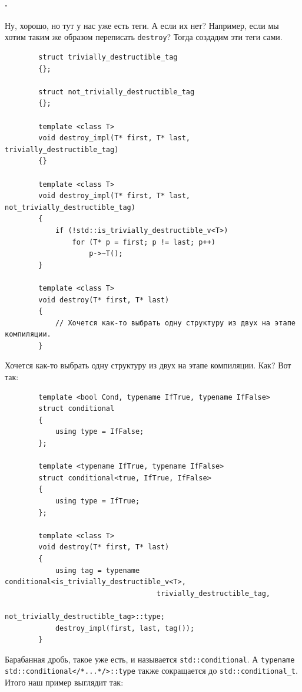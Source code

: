 \documentclass{article}
\begin{document}
    \paragraph{.}
    Ну, хорошо, но тут у нас уже есть теги. А если их нет? Например, если мы хотим таким же образом переписать \texttt{destroy}? Тогда создадим эти теги сами.
    \begin{verbatim}
        struct trivially_destructible_tag
        {};

        struct not_trivially_destructible_tag
        {};

        template <class T>
        void destroy_impl(T* first, T* last, trivially_destructible_tag)
        {}

        template <class T>
        void destroy_impl(T* first, T* last, not_trivially_destructible_tag)
        {
            if (!std::is_trivially_destructible_v<T>)
                for (T* p = first; p != last; p++)
                    p->~T();
        }
    
        template <class T>
        void destroy(T* first, T* last)
        {
            // Хочется как-то выбрать одну структуру из двух на этапе компиляции.
        }
    \end{verbatim}
    Хочется как-то выбрать одну структуру из двух на этапе компиляции. Как? Вот так:
    \begin{verbatim}
        template <bool Cond, typename IfTrue, typename IfFalse>
        struct conditional
        {
            using type = IfFalse;
        };

        template <typename IfTrue, typename IfFalse>
        struct conditional<true, IfTrue, IfFalse>
        {
            using type = IfTrue;
        };

        template <class T>
        void destroy(T* first, T* last)
        {
            using tag = typename conditional<is_trivially_destructible_v<T>,
                                    trivially_destructible_tag,
                                    not_trivially_destructible_tag>::type;
            destroy_impl(first, last, tag());
        }
    \end{verbatim}
    Барабанная дробь, такое уже есть, и называется \texttt{std::conditional}. А \texttt{typename std::conditional</*...*/>::type} также сокращается до \texttt{std::conditional_t}. Итого наш пример выглядит так:
\end{document}
